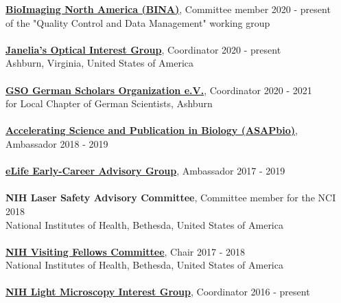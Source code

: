 \documentclass[margin,line]{res}
\begin{document}
\begin{resume}
{\bf \href{https://www.bioimagingna.org/}{BioImaging North America (BINA)}}, Committee member \hfill {2020 - present}\\
of the "Quality Control and Data Management" working group\\
\vspace*{-3mm}\\
{\bf \href{https://www.janelia.org/content/optical-interest-group}{Janelia's Optical Interest Group}}, Coordinator \hfill {2020 - present}\\
Ashburn, Virginia, United States of America\\
\vspace*{-3mm}\\
{\bf \href{https://www.gain-network.org/en/about-gain/gain-chapters/}{GSO German Scholars Organization e.V.}}, Coordinator  \hfill {2020 - 2021}\\
for Local Chapter of German Scientists, Ashburn\\
\vspace*{-3mm}\\
{\bf \href{https://asapbio.org/preprint-info/preprint-stories}{Accelerating Science and Publication in Biology (ASAPbio)}}, Ambassador \hfill {2018 - 2019}\\
\vspace*{-3mm}\\
{\bf \href{hhttps://elifesciences.org/inside-elife/912b0679/early-career-advisory-group-elife-welcomes-150-ambassadors-of-good-practice-in-science}{eLife Early-Career Advisory Group}}, Ambassador \hfill {2017 - 2019}\\
\vspace*{-3mm}\\
{\bf NIH Laser Safety Advisory Committee}, Committee member for the NCI \hfill {2018}\\
National Institutes of Health, Bethesda, United States of America\\
\vspace*{-3mm}\\
{\bf \href{https://www.training.nih.gov/felcom/visitingfellows2}{NIH Visiting Fellows Committee}}, Chair \hfill {2017 - 2018}\\
National Institutes of Health, Bethesda, United States of America\\
\vspace*{-3mm}\\
{\bf \href{https://confocal.ccr.cancer.gov/light-microscopy-interest-group/}{NIH Light Microscopy Interest Group}}, Coordinator \hfill {2016 - present}\\

\end{resume}
\end{document}
